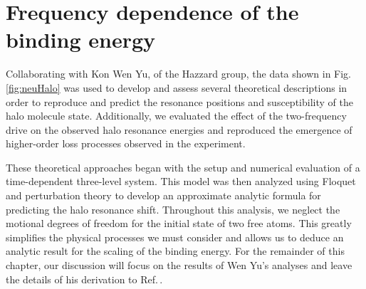 %	
%
%	
%
%
%
%
%
%
%
%
%
%
%
%	
	
	
\section{Frequency dependence of the binding energy} \label{sec:highE_theory}		
Collaborating with Kon Wen Yu, of the Hazzard group, the data shown in Fig.\,\ref{fig:neuHalo} was used to develop and assess several theoretical descriptions in order to reproduce and predict the resonance positions and susceptibility of the halo molecule state.
Additionally, we evaluated the effect of the two-frequency drive on the observed halo resonance energies and reproduced the emergence of higher-order loss processes observed in the experiment.

These theoretical approaches began with the setup and numerical evaluation of a time-dependent three-level system.
This model was then analyzed using Floquet and perturbation theory to develop an approximate analytic formula for predicting the halo resonance shift.
Throughout this analysis, we neglect the motional degrees of freedom for the initial state of two free atoms.
This greatly simplifies the physical processes we must consider and allows us to deduce an analytic result for the scaling of the binding energy.
For the remainder of this chapter, our discussion will focus on the results of Wen Yu's analyses and leave the details of his derivation to Ref.\,\cite{Kon2018}.

